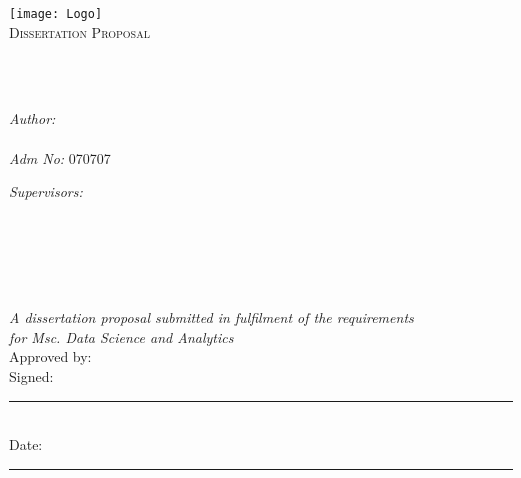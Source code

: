 \documentclass[
  11pt,
  oneside,
  english,
  singlespacing,
  headsepline,
]{MastersDoctoralThesis}
\author{\href{https://bonfacemunyoki.com}{Bonface Munyoki Kilyungi}}
\begin{document}
\frontmatter

\pagestyle{plain}

\begin{titlepage}
\begin{center}

\vspace*{.06\textheight}
\texttt{[image: Logo]}\\ %
\textsc{\Large Dissertation Proposal}\\[0.5cm] %

\HRule \\[0.4cm] %
{\huge \bfseries \ttitle\par}\vspace{0.4cm} %
\HRule \\[1.5cm] %

\begin{minipage}[t]{0.4\textwidth}
\begin{flushleft} \large
\emph{Author:}\\
\href{https://bonfacemunyoki.com}{\authorname} \\
\emph{Adm No:} 070707
\end{flushleft}
\end{minipage}
\begin{minipage}[t]{0.4\textwidth}
  \begin{flushright} \large
    \emph{Supervisors:} \\
    \supnamei\\
    \supnameii\\
    \supnameiii\\
    \supnameiv
\end{flushright}
\end{minipage}\\

\vfill

\large \textit{A dissertation proposal submitted in fulfilment of the
  requirements\\ for Msc. Data Science and Analytics}\\[1cm]

\noindent Approved by: \supnamei\\[1cm]
\noindent Signed:
\rule[0pt]{25em}{0.5pt}\\[1cm] %

\noindent Date:
\rule[0pt]{25em}{0.5pt} %


\end{center}

\end{titlepage}
\end{document}
